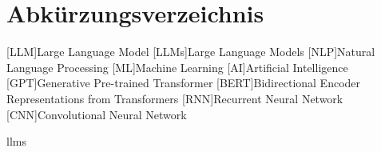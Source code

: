 \documentclass[a4paper, 12pt]{article}
\newcounter{lastromanpage}
\begin{document}

\newpage
\tableofcontents
\newpage
\section*{Abkürzungsverzeichnis}
\begin{acronym}[BERT]
    [LLM]{Large Language Model}
    [LLMs]{Large Language Models}
    [NLP]{Natural Language Processing}
    [ML]{Machine Learning}
    [AI]{Artificial Intelligence}
    [GPT]{Generative Pre-trained Transformer}
    [BERT]{Bidirectional Encoder Representations from Transformers}
    [RNN]{Recurrent Neural Network}
    [CNN]{Convolutional Neural Network}
\end{acronym}
\newpage
\setcounter{lastromanpage}{\value{page}} %


\acp{llm}











\newpage
{}
\setcounter{page}{\value{lastromanpage}} %
\printbibliography
\end{document}
